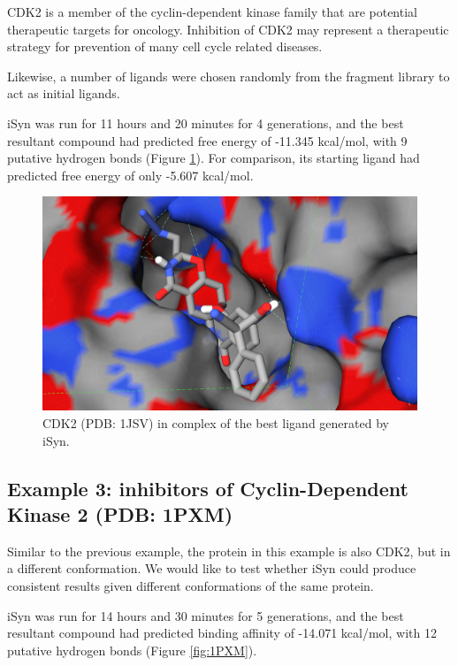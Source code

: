 CDK2 is a member of the cyclin-dependent kinase family that are potential therapeutic targets for oncology. Inhibition of CDK2 may represent a therapeutic strategy for prevention of many cell cycle related diseases.

Likewise, a number of ligands were chosen randomly from the fragment library to act as initial ligands.

iSyn was run for 11 hours and 20 minutes for 4 generations, and the best resultant compound had predicted free energy of -11.345 kcal/mol, with 9 putative hydrogen bonds (Figure \ref{fig:1JSV}). For comparison, its starting ligand had predicted free energy of only -5.607 kcal/mol.

\begin{figure}
\begin{center}
\includegraphics[width=\linewidth]{../isyn/1JSV.png}
\end{center}
\caption{CDK2 (PDB: 1JSV) in complex of the best ligand generated by iSyn.}
\label{fig:1JSV}
\end{figure}

\subsection{Example 3: inhibitors of Cyclin-Dependent Kinase 2 (PDB: 1PXM)}

Similar to the previous example, the protein in this example is also CDK2, but in a different conformation. We would like to test whether iSyn could produce consistent results given different conformations of the same protein.

iSyn was run for 14 hours and 30 minutes for 5 generations, and the best resultant compound had predicted binding affinity of -14.071 kcal/mol, with 12 putative hydrogen bonds (Figure \ref{fig:1PXM}).
 
